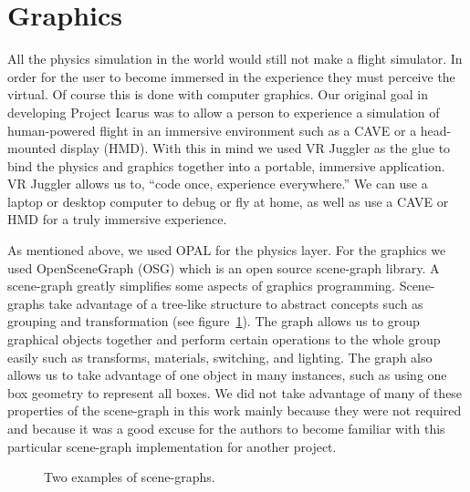 \documentclass{article}
\begin{document}
\section{Graphics}
All the physics simulation in the world would still not make a flight
simulator.  In order for the user to become immersed in the experience they
must perceive the virtual.  Of course this is done with computer graphics.  Our
original goal in developing Project Icarus was to allow a person to experience
a simulation of human-powered flight in an immersive environment such as a CAVE
or a head-mounted display (HMD).  With this in mind we used VR Juggler as the
glue to bind the physics and graphics together into a portable, immersive
application.  VR Juggler allows us to, ``code once, experience everywhere.'' We
can use a laptop or desktop computer to debug or fly at home, as well as use a
CAVE or HMD for a truly immersive experience.

As mentioned above, we used OPAL for the physics layer.  For the graphics we
used OpenSceneGraph (OSG) which is an open source scene-graph library.  A
scene-graph greatly simplifies some aspects of graphics programming.
Scene-graphs take advantage of a tree-like structure to abstract concepts such
as grouping and transformation (see figure~\ref{fig:scenegraph}).  The graph
allows us to group graphical objects together and perform certain operations to
the whole group easily such as transforms, materials, switching, and lighting.
The graph also allows us to take advantage of one object in many instances,
such as using one box geometry to represent all boxes.  We did not take
advantage of many of these properties of the scene-graph in this work mainly
because they were not required and because it was a good excuse for the authors
to become familiar with this particular scene-graph implementation for another
project.

\begin{figure}[h!t]
\begin{center}
\end{center}
\caption{Two examples of scene-graphs.}
\label{fig:scenegraph}
\end{figure}
\end{document}
